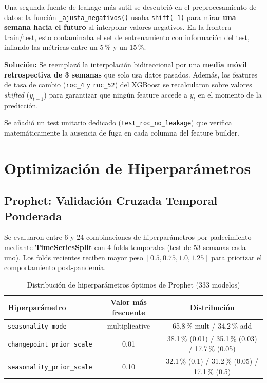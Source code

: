 \documentclass[12pt, letterpaper]{article}
\begin{document}
Una segunda fuente de leakage más sutil se descubrió en el preprocesamiento de datos: la función \texttt{\_ajusta\_negativos()} usaba \texttt{shift(-1)} para mirar \textbf{una semana hacia el futuro} al interpolar valores negativos. En la frontera train/test, esto contaminaba el set de entrenamiento con información del test, inflando las métricas entre un 5\,\% y un 15\,\%.

\textbf{Solución:} Se reemplazó la interpolación bidireccional por una \textbf{media móvil retrospectiva de 3 semanas} que solo usa datos pasados. Además, los features de tasa de cambio (\texttt{roc\_4} y \texttt{roc\_52}) del XGBoost se recalcularon sobre valores \textit{shifted} ($y_{t-1}$) para garantizar que ningún feature accede a $y_t$ en el momento de la predicción.

Se añadió un test unitario dedicado (\texttt{test\_roc\_no\_leakage}) que verifica matemáticamente la ausencia de fuga en cada columna del feature builder.

\newpage

\section{Optimización de Hiperparámetros}\label{sec:opt}

\subsection{Prophet: Validación Cruzada Temporal Ponderada}

Se evaluaron entre 6 y 24 combinaciones de hiperparámetros por padecimiento mediante \textbf{TimeSeriesSplit} con 4 folds temporales (test de 53 semanas cada uno). Los folds recientes reciben mayor peso $[0.5, 0.75, 1.0, 1.25]$ para priorizar el comportamiento post-pandemia.

\begin{table}[H]
\centering
\caption{Distribución de hiperparámetros óptimos de Prophet (333 modelos)}
\label{tab:prophet_hp}
\small
\begin{tabular}{lcc}
\toprule
\textbf{Hiperparámetro} & \textbf{Valor más frecuente} & \textbf{Distribución} \\
\midrule
\texttt{seasonality\_mode} & multiplicative & 65.8\,\% mult / 34.2\,\% add \\
\texttt{changepoint\_prior\_scale} & 0.01 & 38.1\,\% (0.01) / 35.1\,\% (0.03) / 17.7\,\% (0.05) \\
\texttt{seasonality\_prior\_scale} & 0.10 & 32.1\,\% (0.1) / 31.2\,\% (0.05) / 17.1\,\% (0.5) \\
\bottomrule
\end{tabular}
\end{table}
\end{document}
